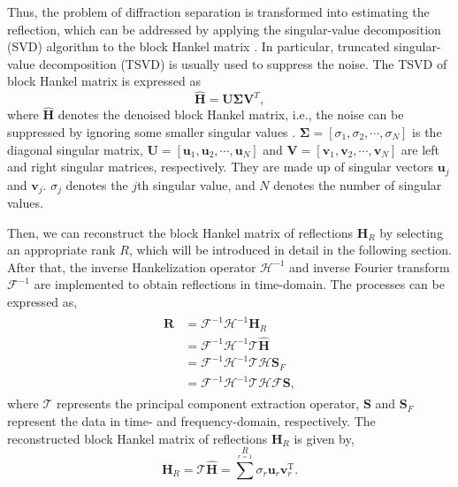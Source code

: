 \documentclass[10pt]{IEEEtran}
\begin{document}
Thus, the problem of diffraction separation is transformed into estimating the reflection, which can be addressed by applying the singular-value decomposition (SVD) algorithm to the block Hankel matrix \cite{Chen2016An}. In particular, truncated singular-value decomposition (TSVD) is usually used to suppress the noise. The TSVD of block Hankel matrix is expressed as
\begin{equation} \label{eq:svd}
\mathbf{\hat{H}}=\mathbf{U}\mathbf{\Sigma}\mathbf{V}^T,
\end{equation}
where $\mathbf{\hat{H}}$ denotes the denoised block Hankel matrix, i.e., the noise can be suppressed by ignoring some smaller singular values \cite{2020Diffraction}.  $\mathbf{\Sigma}=[{\sigma}_1,{\sigma}_2,\cdots,{\sigma}_N]$ is the diagonal singular matrix, $\mathbf{U}=[\mathbf{u}_1,\mathbf{u}_2,\cdots,\mathbf{u}_N]$ and $\mathbf{V}=[\mathbf{v}_1,\mathbf{v}_2,\cdots,\mathbf{v}_N]$ are left and right singular matrices, respectively. They are made up of singular vectors $\mathbf{u}_j$ and $\mathbf{v}_j$. $\sigma_j$ denotes the $j$th singular value, and $N$ denotes the number of singular values.

Then, we can reconstruct the block Hankel matrix of reflections $\mathbf{H}_R$ by selecting an appropriate rank $R$, which will be introduced in detail in the following section. After that, the inverse Hankelization operator $\mathcal{H}^{-1}$ and inverse Fourier transform $\mathcal{F}^{-1}$ are implemented to obtain reflections in time-domain. 
The processes can be expressed as,
\begin{align}\label{eq:rtime}
\begin{split}
\mathbf{R}&= \mathcal{F}^{-1} \mathcal{H}^{-1}\mathbf{H}_R\\ 
&= \mathcal{F}^{-1} \mathcal{H}^{-1}\mathcal{T}\mathbf{\hat{H}}\\ 
&= \mathcal{F}^{-1} \mathcal{H}^{-1}\mathcal{T}\mathcal{H}\mathbf{S}_F\\ 
&=\mathcal{F}^{-1} \mathcal{H}^{-1} \mathcal{T}\mathcal{H}\mathcal{F}\mathbf{S}, 
\end{split}
\end{align}
where $\mathcal{T}$ represents the principal component extraction operator, $\mathbf{S}$ and $\mathbf{S}_F$ represent the data in time- and frequency-domain, respectively. The reconstructed block Hankel matrix of reflections $\mathbf{H}_R$ is given by,
\begin{equation}\label{eq:HR}
\mathbf{H}_R=\mathcal{T}\mathbf{\hat{H}}=\sum^R \limits_{r=1} {\sigma}_r\mathbf{u}_r\mathbf{v}_r^\text{T}.
\end{equation}
\end{document}
